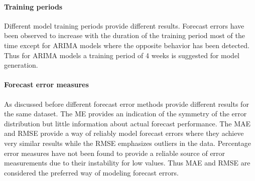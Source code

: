 \paragraph{Training periods}

Different model training periods provide different results. Forecast errors have been observed to increase with the duration of the training period most of the time except for ARIMA models where the opposite behavior has been detected. Thus for ARIMA models a training period of 4 weeks is suggested for model generation. 

\paragraph{Forecast error measures}

As discussed before different forecast error methods provide different results for the same dataset. The ME provides an indication of the symmetry of the error distribution but little information about actual forecast performance. The MAE and RMSE provide a way of reliably model forecast errors where they achieve very similar results while the RMSE emphasizes outliers in the data. Percentage error measures have not been found to provide a reliable source of error measurements due to their instability for low values. Thus MAE and RMSE are considered the preferred way of modeling forecast errors. 






